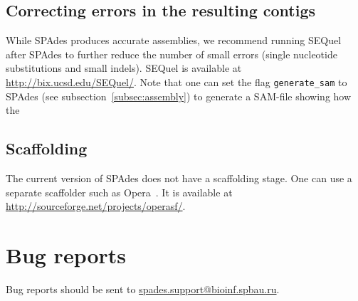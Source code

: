 \documentclass{article}
\def\spades{SPAdes}
\begin{document}
\subsection{Correcting errors in the resulting contigs}
While {\spades} produces accurate assemblies, 
we recommend running SEQuel~\cite{sequel} after {\spades} to further reduce the number of small errors (single nucleotide substitutions and small indels). SEQuel is available at
\url{http://bix.ucsd.edu/SEQuel/}. Note that one can set the flag {\tt generate\_sam} to {\spades}
(see subsection~\ref{subsec:assembly}) to generate a SAM-file showing how the 


\subsection{Scaffolding}
The current version of {\spades} does not have a scaffolding stage.
One can use a separate scaffolder such as Opera~\cite{opera}.
It is available at \url{http://sourceforge.net/projects/operasf/}.

\section{Bug reports}
Bug reports should be sent to \url{spades.support@bioinf.spbau.ru}.




\end{document}
